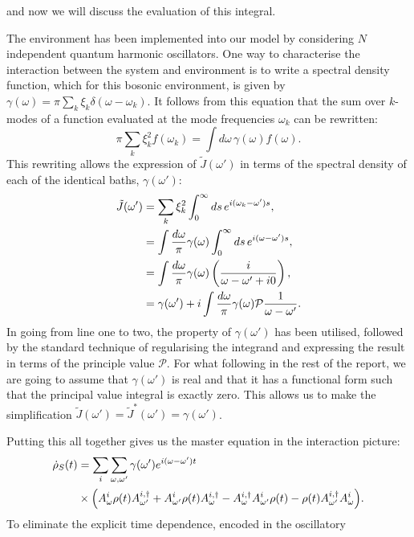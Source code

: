 \documentclass[11pt,a4paper,article,oneside]{memoir}
\begin{document}
and now we will discuss the evaluation of this integral.  \par The
environment has been implemented into our model by considering $N$
independent quantum harmonic oscillators. One way to characterise the
interaction between the system and environment is to write a spectral
density function, which for this bosonic environment, is given by
$\gamma(\omega)=\pi\sum_k\xi_k\delta(\omega-\omega_k)$. It follows
from this equation that the sum over $k$-modes of a function evaluated
at the mode frequencies $\omega_k$ can be rewritten:
\begin{equation}
  \pi \sum_k\xi^2_kf(\omega_k) = \int d\omega\, \gamma(\omega)f(\omega).
\end{equation}
This rewriting allows the expression of $\tilde{J}(\omega')$ in terms of the spectral density of each of the identical baths, $\gamma(\omega')$:
\begin{align}
  \tilde{J}(\omega')&=\sum_k\xi^2_k\int_0^\infty ds\, e^{i(\omega_k-\omega')s}, \notag \\
  &=\int \frac{d\omega}{\pi}\gamma(\omega)\int_0^\infty ds\, e^{i(\omega-\omega')s}, \notag\\
  &=\int \frac{d\omega}{\pi}\gamma(\omega)\left(\frac{i}{\omega-\omega'+i0}\right), \notag\\
  &=\gamma(\omega')+i\int\frac{d\omega}{\pi}\gamma(\omega)\mathcal{P}\frac{1}{\omega-\omega'}.
\end{align}
In going from line one to two, the property of $\gamma(\omega')$ has
been utilised, followed by the standard technique of regularising the
integrand and expressing the result in terms of the principle value
$\mathcal{P}$. For what following in the rest of the report, we are
going to assume that $\gamma(\omega')$ is real and that it has a
functional form such that the principal value integral is exactly
zero. This allows us to make the simplification
$\tilde{J}(\omega')=\tilde{J}^*(\omega')=\gamma(\omega')$.  \par
Putting this all together gives us the master equation in the
interaction picture:
\begin{align}
\dot{\rho}_S(t) &= \sum_i
\sum_{\omega,\omega'}\gamma(\omega')e^{i(\omega-\omega')t}\notag
\\ &\times\Big(A^{i}_{\omega}\rho(t)A^{i,\dagger}_{\omega'}+A^{i}_{\omega'}\rho(t)A^{i,\dagger}_\omega-A^{i,\dagger}_\omega A^{i}_{\omega'}\rho(t)-\rho(t) A^{i,\dagger}_{\omega'}A^{i}_{\omega} \Big).
\end{align}
To eliminate the explicit time dependence, encoded in the oscillatory
\end{document}
